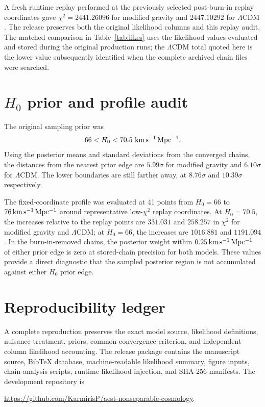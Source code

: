 \documentclass[aps,prd,twocolumn,superscriptaddress,nofootinbib,longbibliography,floatfix]{revtex4-2}
\newcommand{\LCDM}{\Lambda\mathrm{CDM}}
\begin{document}
A fresh runtime replay performed at the previously selected post-burn-in replay coordinates gave $\chi^2=2441.26096$ for modified gravity and $2447.10292$ for $\LCDM$. The release preserves both the original likelihood columns and this replay audit. The matched comparison in Table~\ref{tab:likes} uses the likelihood values evaluated and stored during the original production runs; the $\LCDM$ total quoted here is the lower value subsequently identified when the complete archived chain files were searched.

\section{$H_0$ prior and profile audit}\label{app:h0audit}
The original sampling prior was
\begin{equation}
66<H_0<70.5\ {\rm km\,s^{-1}\,Mpc^{-1}}.
\end{equation}
Using the posterior means and standard deviations from the converged chains, the distances from the nearest prior edge are $5.99\sigma$ for modified gravity and $6.10\sigma$ for $\LCDM$. The lower boundaries are still farther away, at $8.76\sigma$ and $10.39\sigma$ respectively.

The fixed-coordinate profile was evaluated at 41 points from $H_0=66$ to $76\,{\rm km\,s^{-1}\,Mpc^{-1}}$ around representative low-$\chi^2$ replay coordinates. At $H_0=70.5$, the increases relative to the replay points are $331.031$ and $258.257$ in $\chi^2$ for modified gravity and $\LCDM$; at $H_0=66$, the increases are $1016.881$ and $1191.094$. In the burn-in-removed chains, the posterior weight within $0.25\,{\rm km\,s^{-1}\,Mpc^{-1}}$ of either prior edge is zero at stored-chain precision for both models. These values provide a direct diagnostic that the sampled posterior region is not accumulated against either $H_0$ prior edge.

\section{Reproducibility ledger}\label{app:repro}
A complete reproduction preserves the exact model source, likelihood definitions, nuisance treatment, priors, common convergence criterion, and independent-column likelihood accounting. The release package contains the manuscript source, BibTeX database, machine-readable likelihood summary, figure inputs, chain-analysis scripts, runtime likelihood injection, and SHA-256 manifests. The development repository is
\begin{center}
\url{https://github.com/KarmirisP/aest-nonseparable-cosmology}.
\end{center}


\end{document}
